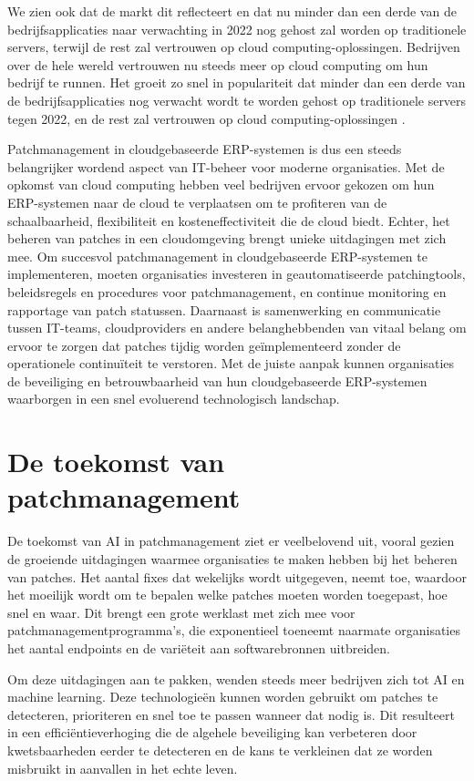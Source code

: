 We zien ook dat de markt dit reflecteert en dat nu minder dan een derde van de bedrijfsapplicaties naar verwachting in 2022 nog gehost zal worden op traditionele servers, terwijl de rest zal vertrouwen op cloud computing-oplossingen. Bedrijven over de hele wereld vertrouwen nu steeds meer op cloud computing om hun bedrijf te runnen. Het groeit zo snel in populariteit dat minder dan een derde van de bedrijfsapplicaties nog verwacht wordt te worden gehost op traditionele servers tegen 2022, en de rest zal vertrouwen op cloud computing-oplossingen \autocite{Pimentel2017}.

Patchmanagement in cloudgebaseerde ERP-systemen is dus een steeds belangrijker wordend aspect van IT-beheer voor moderne organisaties. Met de opkomst van cloud computing hebben veel bedrijven ervoor gekozen om hun ERP-systemen naar de cloud te verplaatsen om te profiteren van de schaalbaarheid, flexibiliteit en kosteneffectiviteit die de cloud biedt. Echter, het beheren van patches in een cloudomgeving brengt unieke uitdagingen met zich mee.
Om succesvol patchmanagement in cloudgebaseerde ERP-systemen te implementeren, moeten organisaties investeren in geautomatiseerde patchingtools, beleidsregels en procedures voor patchmanagement, en continue monitoring en rapportage van patch statussen. Daarnaast is samenwerking en communicatie tussen IT-teams, cloudproviders en andere belanghebbenden van vitaal belang om ervoor te zorgen dat patches tijdig worden geïmplementeerd zonder de operationele continuïteit te verstoren. Met de juiste aanpak kunnen organisaties de beveiliging en betrouwbaarheid van hun cloudgebaseerde ERP-systemen waarborgen in een snel evoluerend technologisch landschap.


\section{De toekomst van patchmanagement}
De toekomst van AI in patchmanagement ziet er veelbelovend uit, vooral gezien de groeiende uitdagingen waarmee organisaties te maken hebben bij het beheren van patches. Het aantal fixes dat wekelijks wordt uitgegeven, neemt toe, waardoor het moeilijk wordt om te bepalen welke patches moeten worden toegepast, hoe snel en waar. Dit brengt een grote werklast met zich mee voor patchmanagementprogramma's, die exponentieel toeneemt naarmate organisaties het aantal endpoints en de variëteit aan softwarebronnen uitbreiden.

Om deze uitdagingen aan te pakken, wenden steeds meer bedrijven zich tot AI en machine learning. Deze technologieën kunnen worden gebruikt om patches te detecteren, prioriteren en snel toe te passen wanneer dat nodig is. Dit resulteert in een efficiëntieverhoging die de algehele beveiliging kan verbeteren door kwetsbaarheden eerder te detecteren en de kans te verkleinen dat ze worden misbruikt in aanvallen in het echte leven.

